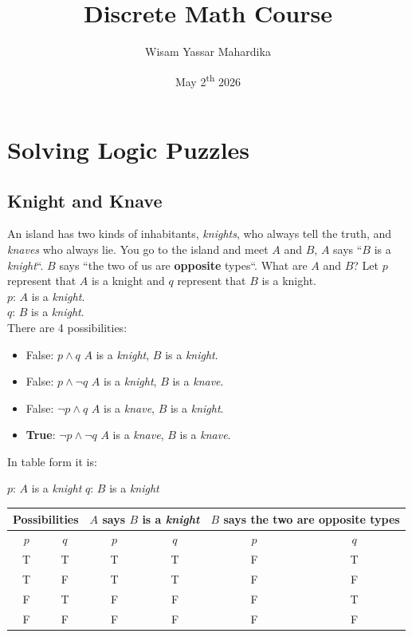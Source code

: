 \documentclass{article}
\title{Discrete Math Course}
\author{Wisam Yassar Mahardika}
\date{May 2\textsuperscript{th} 2026}
\begin{document}
\maketitle
\clearpage
\tableofcontents
\clearpage
\section{Solving Logic Puzzles}
\subsection{Knight and Knave}
An island has two kinds of inhabitants, \textit{knights}, who always tell the truth, and \textit{knaves} who always lie. You go to the island and meet $ A $ and $ B $, $ A $ says ``$ B $ is a \textit{knight}``. $ B $ says ``the two of us are \textbf{opposite} types``. What are $ A $ and $ B $? Let $ p $ represent that $ A $ is a knight and $ q $ represent that $ B $ is a knight.\\
$ p $: $ A $ is a \textit{knight}. \\
$ q $: $ B $ is a \textit{knight}. \\


There are 4 possibilities: 
\begin{itemize}
	\item False: $ p \land q $ $ A $ is a \textit{knight}, $ B $ is a \textit{knight}.
	\item False: $ p \land \neg q $ $ A $ is a \textit{knight}, $ B $ is a \textit{knave}.
	\item False: $ \neg p \land q $ $ A $ is a \textit{knave}, $ B $ is a \textit{knight}.
	\item \textbf{True}: $ \neg p \land \neg q $ $ A $ is a \textit{knave}, $ B $ is a \textit{knave}.
\end{itemize}

In table form it is: \\
\begin{center}
$ p $: $ A $ is a \textit{knight} $ q $: $ B $ is a \textit{knight}
\end{center}


\begin{center}
\begin{tabular}{|c|c|c|c|c|c|}
	\hline
	\multicolumn{2}{|c|}{Possibilities} & \multicolumn{2}{|c|}{$ A $ says $ B $ is a \textit{knight}} & \multicolumn{2}{|c|}{$ B $ says the two are \textbf{opposite} types} \\
	\hline
	$ p $ & $ q $ & $ p $ & $ q $ & $ p $ & $ q $ \\
	\hline
	\hline
	T & T & T & T & F & T \\
	T & F & T & T & F & F \\
	F & T & F & F & F & T \\
	F & F & F & F & F & F \\
	\hline
\end{tabular}
\end{center}
\end{document}
